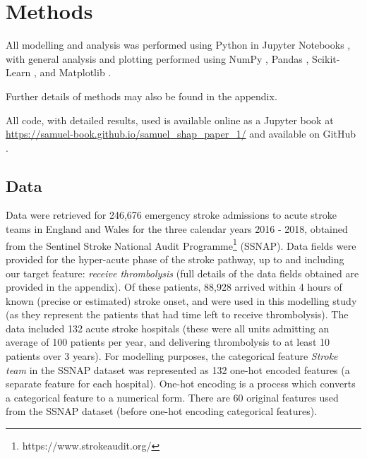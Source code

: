\renewcommand{\thefootnote}{\alph{footnote}} %

\section{Methods}

All modelling and analysis was performed using Python in Jupyter Notebooks \cite{kluyver_jupyter_2016}, with general analysis and plotting performed using NumPy \cite{harris_array_2020}, Pandas \cite{mckinney-proc-scipy-2010}, Scikit-Learn  \cite{pedregosa_scikit-learn_2011}, and Matplotlib \cite{hunter_matplotlib_2007}. 

Further details of methods may also be found in the appendix. 

All code, with detailed results, used is available online as a Jupyter book at \url{https://samuel-book.github.io/samuel_shap_paper_1/} and available on GitHub \cite{samuel_paper_1_github}. 


\subsection{Data}

Data were retrieved for 246,676 emergency stroke admissions to acute stroke teams in England and Wales for the three calendar years 2016 - 2018, obtained from the Sentinel Stroke National Audit Programme\footnote{https://www.strokeaudit.org/} (SSNAP). Data fields were provided for the hyper-acute phase of the stroke pathway, up to and including our target feature: \emph{receive thrombolysis} (full details of the data fields obtained are provided in the appendix). Of these patients, 88,928 arrived within 4 hours of known (precise or estimated) stroke onset, and were used in this modelling study (as they represent the patients that had time left to receive thrombolysis). The data included 132 acute stroke hospitals (these were all units admitting an average of 100 patients per year, and delivering thrombolysis to at least 10 patients over 3 years). For modelling purposes, the categorical feature \emph{Stroke team} in the SSNAP dataset was represented as 132 one-hot encoded features (a separate feature for each hospital). One-hot encoding is a process which converts a categorical feature to a numerical form. There are 60 original features used from the SSNAP dataset (before one-hot encoding categorical features).

